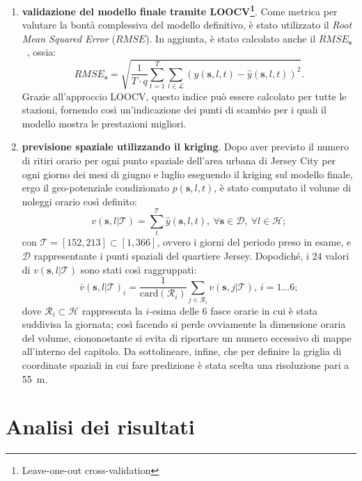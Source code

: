 \begin{enumerate}
	\item \textbf{validazione del modello finale tramite LOOCV\footnote{Leave-one-out cross-validation}}. Come metrica per valutare la bontà complessiva del modello definitivo, è stato utilizzato il \textit{Root Mean Squared Error} ($RMSE$). In aggiunta, è stato calcolato anche il $RMSE_\mathbf{s}$~\citep{paper_f_HDGM}, ossia:
	\begin{equation}
		RMSE_\mathbf{s} = \sqrt{\frac{1}{T\cdot q}\sum_{t=1}^{T}\sum_{l\in\mathcal{L}}^{} (y(\mathbf{s}, l, t) - \hat{y}(\mathbf{s}, l, t))^2}.
	\end{equation}
	Grazie all'approccio LOOCV, questo indice può essere calcolato per tutte le stazioni, fornendo così un'indicazione dei punti di scambio per i quali il modello mostra le prestazioni migliori. 
	\item \textbf{previsione spaziale utilizzando il kriging}. Dopo aver previsto il numero di ritiri orario per ogni punto spaziale dell'area urbana di Jersey City per ogni giorno dei mesi di giugno e luglio eseguendo il kriging sul modello finale, ergo il geo-potenziale condizionato $p(\mathbf{s}, l, t)$, è stato computato il volume di noleggi orario così definito:
	\begin{equation}
		v(\mathbf{s}, l|\mathcal{T}) = \sum_{t}^{\mathcal{T}} \hat{y}(\mathbf{s}, l, t), \ \forall \mathbf{s}\in\mathcal{D}, \ \forall l\in\mathcal{H};
		\label{equazioine_kriging_t}
	\end{equation}
	con $\mathcal{T} = [152, 213]\subset [1, 366]$, ovvero i giorni del periodo preso in esame, e $\mathcal{D}$ rappresentante i punti spaziali del quartiere Jersey. Dopodiché, i \num{24} valori di $v(\mathbf{s}, l|\mathcal{T})$ sono stati così raggruppati:
	\begin{equation}
		\bar{v}(\mathbf{s}, l|\mathcal{T})_i = \frac{1}{\text{card}(\mathcal{R}_i)}\sum_{j\in\mathcal{R}_i}^{}v(\mathbf{s}, j|\mathcal{T}), \ i=1\dots 6;
	\end{equation}
	dove $\mathcal{R}_i\subset\mathcal{H}$ rappresenta la $i$-esima delle \num{6} fasce orarie in cui è stata suddivisa la giornata; così facendo si perde ovviamente la dimensione oraria del volume, ciononostante si evita di riportare un numero eccessivo di mappe all'interno del capitolo. Da sottolineare, infine, che per definire la griglia di coordinate spaziali in cui fare predizione è stata scelta una risoluzione pari a \num{55}~\unit{\meter}.
\end{enumerate}

\section{Analisi dei risultati}
